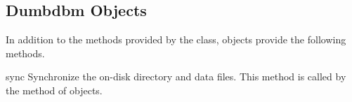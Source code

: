 \subsection{Dumbdbm Objects \label{dumbdbm-objects}}

In addition to the methods provided by the  class,
 objects provide the following methods.

\begin{methoddesc}[dumbdbm]{sync}{}
Synchronize the on-disk directory and data files.  This method is called by
the  method of  objects.
\end{methoddesc}
